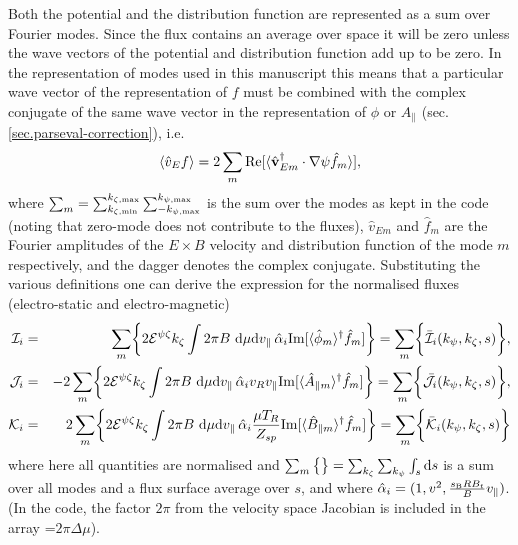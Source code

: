 Both the potential and the distribution function are represented as a sum over 
Fourier modes.  Since the flux contains an average over space it will be zero unless 
the wave vectors of the potential and distribution function add up to be zero. In the 
representation of modes used in this manuscript this means that a particular wave 
vector of the representation of $f$ must be combined with the complex conjugate of 
the same wave vector in the representation of $\phi$ or $A_{\parallel}$ (sec. \ref{sec.parseval-correction}), i.e.\  
\begin{equation} 
\langle \hat v_E f \rangle  = 2 \sum_m {\rm Re}  [ \langle \hat {\bf v}_{Em}^\dagger 
\cdot \nabla \psi  \hat f_m \rangle ],
\end{equation} 
where 
$\sum_m = \sum_{k_{\zeta,{\rm min}}}^{k_{\zeta,{\rm max}}} \sum_{-k_{\psi,{\rm max}}}^{k_{\psi,{\rm max}}}$ is the sum over the modes as kept in the code
(noting that zero-mode does not contribute to the fluxes), 
$\hat v_{Em}$ and $\hat f_m$ are the Fourier amplitudes of the $E \times B$ velocity and distribution function of the mode $m$ respectively, 
and the dagger denotes the complex conjugate.
Substituting the various definitions one can derive the expression for the normalised fluxes (electro-static and electro-magnetic) 
\begin{align}
\label{eq.fluxes-def}
{\cal I}_i &=& \sum_m \biggl \{ 2 {\cal E}^{\psi \zeta} k_\zeta \int 2 \pi B ~{\rm d} 
\mu {\rm d} v_\parallel \,  \hat{\alpha}_i {\rm Im} [ \langle \hat \phi_m \rangle^\dagger \hat f_m ] \biggr \} = \sum_m \biggl \{ 
\bar{\cal I}_i(k_\psi,k_\zeta,s) \biggr \},\\
{\cal J}_i &=& -2 \sum_m \biggl \{ 2 {\cal E}^{\psi \zeta} k_\zeta \int 2 \pi B ~{\rm d} 
\mu {\rm d} v_\parallel \,  \hat{\alpha}_i v_R v_\parallel {\rm Im} [ \langle \hat A_{\parallel m} \rangle^\dagger \hat f_m ] \biggr \} = \sum_m
\biggl \{ \bar{\cal J}_i(k_\psi,k_\zeta,s) \biggr \},\\
{\cal K}_i &=& 2 \sum_m \biggl \{ 2 {\cal E}^{\psi \zeta} k_\zeta \int 2 \pi B ~{\rm d} 
\mu {\rm d} v_\parallel \,  \hat{\alpha}_i \frac{\mu T_R}{Z_{sp}} {\rm Im} [ \langle \hat B_{\parallel m} \rangle^\dagger \hat f_m ] \biggr \} =
\sum_m \biggl \{ \bar{\cal K}_i(k_\psi,k_\zeta,s) \biggr \}
\end{align}
where here all quantities are normalised and $\sum_m \big \{\big \}=\sum_{k_\zeta} \sum_{k_\psi} \int_{s} {\rm d}s$ is a sum over all modes 
and a flux surface average over $s$, and where $\hat{\alpha}_i = (1, v^2,\frac{s_{\mathrm{B}}RB_t}{B}v_\parallel)$.  
(In the code, the factor $2\pi$ from the velocity space Jacobian is included in the array \name{intmu}=$2\pi \Delta \mu$).

